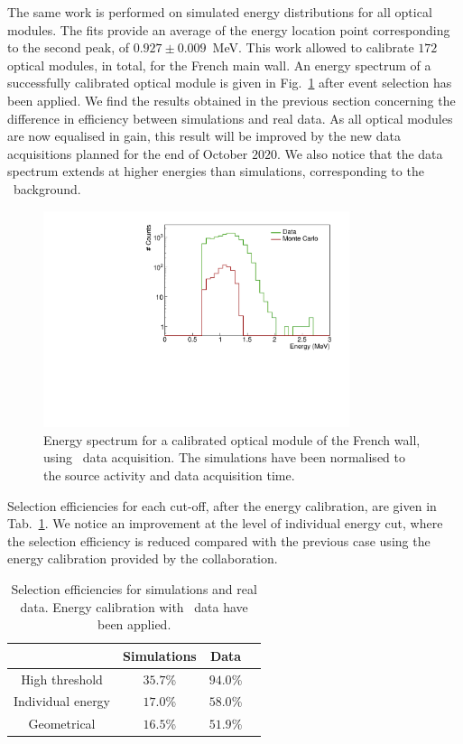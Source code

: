 The same work is performed on simulated energy distributions for all optical modules.
The fits provide an average of the energy location point corresponding to the second peak, of $0.927\pm0.009$~MeV.
This work allowed to calibrate $172$ optical modules, in total, for the French main wall.
An energy spectrum of a successfully calibrated optical module is given in Fig.~\ref{fig:calib_energy_OM} after event selection has been applied.
We find the results obtained in the previous section concerning the difference in efficiency between simulations and real data.
As all optical modules are now equalised in gain, this result will be improved by the new data acquisitions planned for the end of October $2020$.
We also notice that the data spectrum extends at higher energies than simulations, corresponding to the \Tl\ background.
\begin{figure}[h]
  \centering
  \includegraphics[width=0.8\textwidth]{CobaltStudy/fig_CobaltStudy/calib_energy_done.pdf}
  \caption{Energy spectrum for a calibrated optical module of the French wall, using \Co\ data acquisition.
    The simulations have been normalised to the source activity and data acquisition time.
    \label{fig:calib_energy_OM}}
\end{figure}

Selection efficiencies for each cut-off, after the energy calibration, are given in Tab.~\ref{tab:Co_cut_eff_calib}.
We notice an improvement at the level of individual energy cut, where the selection efficiency is reduced compared with the previous case using the energy calibration provided by the collaboration.
\begin{table}[h]
  \centering
  \begin{tabular}{|c|c|c|c|}
    \hline
    & Simulations & Data \\
    \hline\hline
    High threshold & $35.7$\% & $94.0$\% \\
    Individual energy & $17.0$\% & $58.0$\% \\
    Geometrical & $16.5$\% & $51.9$\% \\
    \hline
  \end{tabular}
  \caption{Selection efficiencies for simulations and real data.
    Energy calibration with \Co\ data have been applied.
    \label{tab:Co_cut_eff_calib}}
\end{table}

